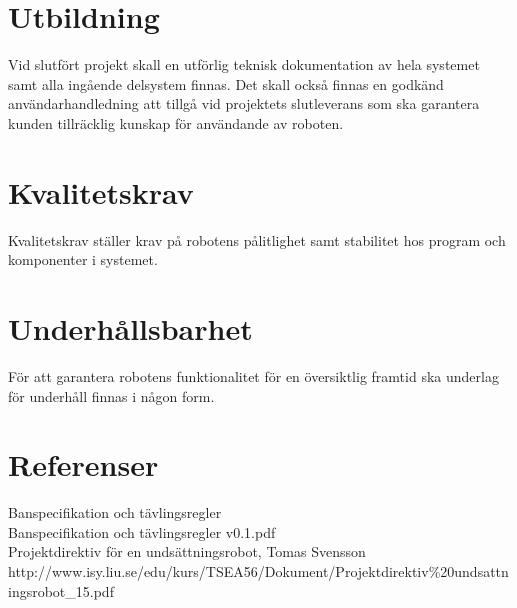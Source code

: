 \documentclass[11pt]{article}
\begin{document}
\begin{flushleft}
\section{Utbildning}
Vid slutfört projekt skall en utförlig teknisk dokumentation av hela systemet samt alla ingående delsystem finnas. Det skall också finnas en godkänd användarhandledning att tillgå vid projektets slutleverans som ska garantera kunden tillräcklig kunskap för användande av roboten.

\section{Kvalitetskrav}
Kvalitetskrav ställer krav på robotens pålitlighet samt stabilitet hos program och komponenter i systemet.

\section{Underhållsbarhet}
För att garantera robotens funktionalitet för en översiktlig framtid ska underlag för underhåll finnas i någon form.

\setcounter{secnumdepth}{0}
\pagebreak
\section{Referenser}
Banspecifikation och tävlingsregler \\
Banspecifikation och tävlingsregler v0.1.pdf
\\[0.1in]
Projektdirektiv för en undsättningsrobot, Tomas Svensson
http://www.isy.liu.se/edu/kurs/TSEA56/Dokument/Projektdirektiv\%20undsattningsrobot\_15.pdf

\setcounter{secnumdepth}{2}



\end{flushleft}
\end{document}

